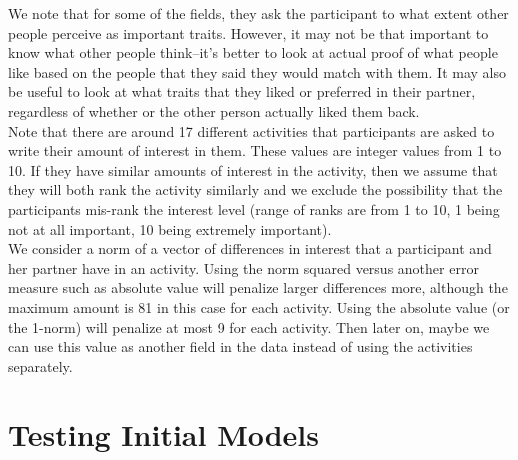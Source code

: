 \documentclass{article}
\begin{document}
We note that for some of the fields, they ask the participant to what extent other people perceive as important traits. However, it may not be that important to know what other people think--it's better to look at actual proof of what people like based on the people that they said they would match with them.  It may also be useful to look at what traits that they liked or preferred in their partner, regardless of whether or the other person actually liked them back.\\

Note that there are around 17 different activities that participants are asked to 
write their amount of interest in them.  These values are integer values from 1 to 10.  If they have similar amounts of interest in the activity, then we assume that they will both rank the activity similarly and we exclude the possibility that the participants mis-rank the interest level (range of ranks are from 1 to 10, 1 being not at all important, 10 being extremely important).\\

We consider a norm of a vector of differences in interest that a participant and her partner have in an activity.  Using the norm squared versus another error measure such as absolute value will penalize larger differences more, although the maximum amount is 81 in this case for each activity. Using the absolute value (or the 1-norm) will penalize at most 9 for each activity. Then later on, maybe we can use this value as another field in the data instead of using the activities separately. \\
 
 \section{Testing Initial Models}
 
\end{document}
